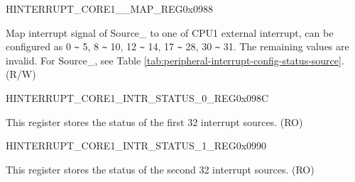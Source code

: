 \begin{register}{H}{INTERRUPT\_CORE1\_\_MAP\_REG}{0x{}0988}\label{regdesc:INTERRUPTCORE1DMAEXTMEMREJECTINTMAPREG}
%
%
\regnewline%
\begin{regdesc}\begin{reglist}
\item [INTERRUPT\_CORE1\_SOURCE\_\regindex{Y}\_MAP] Map interrupt signal of Source\_ to one of CPU1 external interrupt, can be configured as 0 \verb+~+ 5, 8 \verb+~+ 10, 12 \verb+~+ 14, 17 \verb+~+ 28, 30 \verb+~+ 31. The remaining values are invalid. For Source\_, see Table \ref{tab:peripheral-interrupt-config-status-source}. (R/W)
\end{reglist}\end{regdesc}
\end{register} \vspace{-3em}

\begin{register}{H}{INTERRUPT\_CORE1\_INTR\_STATUS\_0\_REG}{0x{}098C}\label{regdesc:INTERRUPTCORE1INTRSTATUS0REG}
%
\regnewline%
\begin{regdesc}\begin{reglist}
\label{fielddesc:INTERRUPTCORE1INTRSTATUS0}\item [INTERRUPT\_CORE1\_INTR\_STATUS\_0] This register stores the status of the first 32 interrupt sources. (RO)
\end{reglist}\end{regdesc}
\end{register}


\begin{register}{H}{INTERRUPT\_CORE1\_INTR\_STATUS\_1\_REG}{0x{}0990}\label{regdesc:INTERRUPTCORE1INTRSTATUS1REG}
%
\regnewline%
\begin{regdesc}\begin{reglist}
\label{fielddesc:INTERRUPTCORE1INTRSTATUS1}\item [INTERRUPT\_CORE1\_INTR\_STATUS\_1] This register stores the status of the second 32 interrupt sources. (RO)
\end{reglist}\end{regdesc}
\end{register}


